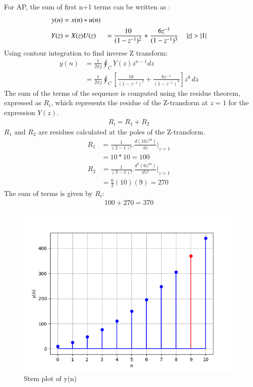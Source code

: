 \documentclass[journal,12pt,twocolumn]{IEEEtran}
\theoremstyle{remark}
\begin{document}
For AP, the sum of first n+1 terms can be written as :
\begin{align}
	 y(n)&=x(n)*u(n) \\
	 Y(z) &= X(z)U(z)
	&=\frac{10}{(1-z^{-1})^2} + \frac{6z^{-1}}{(1-z^{-1})^3}
	\quad \left\vert z\right\vert>\left\vert1\right\vert
\end{align}
Using contour integration to find inverse Z transform:
\begin{align}
	y(n) &= \frac{1}{2\pi j} \oint_C Y(z) z^{n-1} dz\\
	&= \frac{1}{2\pi j} \oint_C [ \frac{10}{(1-z^{-1})^2} + \frac{6z^{-1}}{(1-z^{-1})^3} ]z^{8} \, dz
\end{align}
The sum of the terms of the sequence is computed using the residue theorem, expressed as $R_i$, which represents the residue of the Z-transform at $ z=1 $ for the expression $ Y(z) $.
\begin{align}
	R_i=R_1 + R_2
\end{align}
 $R_1$ and $R_2$ are residues calculated at the poles of the Z-transform.
\begin{align}
		R_1 &= \frac{1}{{(2-1)!}} . \frac{d (10z^{10})}{dz} |_{z=1} \\
	&=10*10=100
\end{align}
\begin{align}
	R_2 &= \frac{1}{{(3-1)!}} . \frac{d^2(6z^{10})}{dz^2} |_{z=1} \\
	&= \frac{6}{2}(10)(9) = 270
\end{align}
The sum of terms is given by $R_i$:
 \begin{align}
100 + 270 = 370
\end{align}
\begin{figure}
    \centering
    \includegraphics[width=\columnwidth]{figs/plot2.png}
    \caption{Stem plot of y(n)}
    \label{fig:11.9.5.8fig1}
\end{figure}
\end{document}
